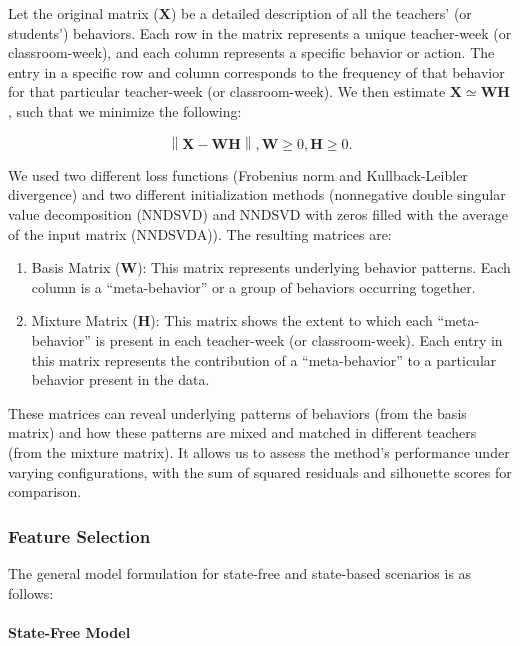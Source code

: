 \documentclass[
  number,
  preprint,
  3p,
  onecolumn]{elsarticle}
\let\oldparagraph\paragraph
\renewcommand{\paragraph}[1]{\oldparagraph{#1}\mbox{}}
\providecommand{\tightlist}{%
  \setlength{\itemsep}{0pt}\setlength{\parskip}{0pt}}\usepackage{longtable,booktabs,array}
\begin{document}
Let the original matrix (\(\mathbf{X}\)) be a detailed description of
all the teachers' (or students') behaviors. Each row in the matrix
represents a unique teacher-week (or classroom-week), and each column
represents a specific behavior or action. The entry in a specific row
and column corresponds to the frequency of that behavior for that
particular teacher-week (or classroom-week). We then estimate
\(\mathbf{X} \simeq \mathbf{W}\mathbf{H}\), such that we minimize the
following:

\[
\left\| \mathbf{X} - \mathbf{W}\mathbf{H} \right\| , \mathbf{W} \geq 0, \mathbf{H} \geq 0.
\]

We used two different loss functions (Frobenius norm and
Kullback-Leibler divergence) and two different initialization methods
(nonnegative double singular value decomposition (NNDSVD) and NNDSVD
with zeros filled with the average of the input matrix (NNDSVDA)). The
resulting matrices are:

\begin{enumerate}
\def\labelenumi{\arabic{enumi}.}
\tightlist
\item
  Basis Matrix (\(\mathbf{W}\)): This matrix represents underlying
  behavior patterns. Each column is a ``meta-behavior'' or a group of
  behaviors occurring together.
\item
  Mixture Matrix (\(\mathbf{H}\)): This matrix shows the extent to which
  each ``meta-behavior'' is present in each teacher-week (or
  classroom-week). Each entry in this matrix represents the contribution
  of a ``meta-behavior'' to a particular behavior present in the data.
\end{enumerate}

These matrices can reveal underlying patterns of behaviors (from the
basis matrix) and how these patterns are mixed and matched in different
teachers (from the mixture matrix). It allows us to assess the method's
performance under varying configurations, with the sum of squared
residuals and silhouette scores for comparison.

\subsubsection{Feature Selection}\label{feature-selection-1}

The general model formulation for state-free and state-based scenarios
is as follows:

\paragraph{State-Free Model}\label{state-free-model}
\end{document}
